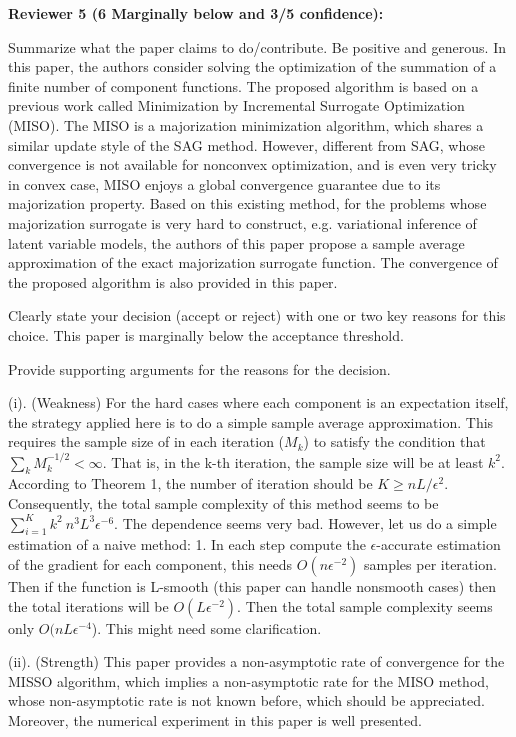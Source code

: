 \documentclass{article} %
\begin{document}
\textbf{Reviewer 5 (6 Marginally below and 3/5 confidence):}

Summarize what the paper claims to do/contribute. Be positive and generous.
In this paper, the authors consider solving the optimization of the summation of a finite number of component functions. The proposed algorithm is based on a previous work called Minimization by Incremental Surrogate Optimization (MISO). The MISO is a majorization minimization algorithm, which shares a similar update style of the SAG method. However, different from SAG, whose convergence is not available for nonconvex optimization, and is even very tricky in convex case, MISO enjoys a global convergence guarantee due to its majorization property. Based on this existing method, for the problems whose majorization surrogate is very hard to construct, e.g. variational inference of latent variable models, the authors of this paper propose a sample average approximation of the exact majorization surrogate function. The convergence of the proposed algorithm is also provided in this paper.

Clearly state your decision (accept or reject) with one or two key reasons for this choice. This paper is marginally below the acceptance threshold.

Provide supporting arguments for the reasons for the decision.

(i). (Weakness) For the hard cases where each component is an expectation itself, the strategy applied here is to do a simple sample average approximation. This requires the sample size of in each iteration ($M_k$) to satisfy the condition that $\sum_k M_k^{-1/2}<\infty$. That is, in the k-th iteration, the sample size will be at least $k^2$. According to Theorem 1, the number of iteration should be $K\geq nL/\epsilon^2$. Consequently, the total sample complexity of this method seems to be $\sum_{i=1}^{K} k^2 ~ n^3L^3\epsilon^{-6}$. The 
 dependence seems very bad. However, let us do a simple estimation of a naive method: 1. In each step compute the $\epsilon$-accurate estimation of the gradient for each component, this needs $O(n \epsilon^{-2})$ samples per iteration. Then if the function is L-smooth (this paper can handle nonsmooth cases) then the total iterations will be $O(L\epsilon^{-2})$. Then the total sample complexity seems only $O(nL\epsilon^{-4}$). This might need some clarification.

(ii). (Strength) This paper provides a non-asymptotic rate of convergence for the MISSO algorithm, which implies a non-asymptotic rate for the MISO method, whose non-asymptotic rate is not known before, which should be appreciated. Moreover, the numerical experiment in this paper is well presented.
\end{document}
